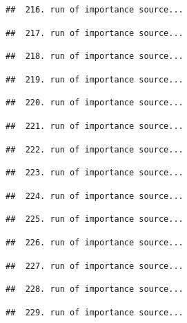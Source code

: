 \documentclass[
]{article}
\begin{document}
\begin{verbatim}
##  216. run of importance source...
\end{verbatim}

\begin{verbatim}
##  217. run of importance source...
\end{verbatim}

\begin{verbatim}
##  218. run of importance source...
\end{verbatim}

\begin{verbatim}
##  219. run of importance source...
\end{verbatim}

\begin{verbatim}
##  220. run of importance source...
\end{verbatim}

\begin{verbatim}
##  221. run of importance source...
\end{verbatim}

\begin{verbatim}
##  222. run of importance source...
\end{verbatim}

\begin{verbatim}
##  223. run of importance source...
\end{verbatim}

\begin{verbatim}
##  224. run of importance source...
\end{verbatim}

\begin{verbatim}
##  225. run of importance source...
\end{verbatim}

\begin{verbatim}
##  226. run of importance source...
\end{verbatim}

\begin{verbatim}
##  227. run of importance source...
\end{verbatim}

\begin{verbatim}
##  228. run of importance source...
\end{verbatim}

\begin{verbatim}
##  229. run of importance source...
\end{verbatim}
\end{document}
